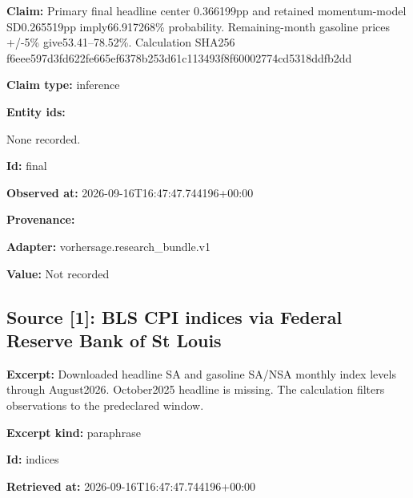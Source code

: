 \documentclass[11pt]{article}
\begin{document}
\par\noindent\textbf{Claim:} Primary final headline center 0.366199pp and retained momentum-model SD0.265519pp imply66.917268\% probability. Remaining-month gasoline prices +/-5\% give53.41–78.52\%. Calculation SHA256 f6eee597d3fd\hspace{0pt}622fe665ef63\hspace{0pt}78b253d61c11\hspace{0pt}3493f8f60002\hspace{0pt}774cd5318ddf\hspace{0pt}b2dd

\par\noindent\textbf{Claim type:} inference

\par\noindent\textbf{Entity ids:} \par None recorded.

\par\noindent\textbf{Id:} final

\par\noindent\textbf{Observed at:} 2026-09-16T1\hspace{0pt}6:47:47.7441\hspace{0pt}96+00:00

\par\noindent\textbf{Provenance:} \par \par\noindent\textbf{Adapter:} vorhersage.r\hspace{0pt}esearch\_bund\hspace{0pt}le.v1

\par\noindent\textbf{Value:} Not recorded

\subsection*{\textcolor{epdarkgreen}{Source [1]: BLS CPI indices via Federal Reserve Bank of St Louis}}
\par\noindent\textbf{Excerpt:} Downloaded headline SA and gasoline SA/NSA monthly index levels through August2026. October2025 headline is missing. The calculation filters observations to the predeclared window.

\par\noindent\textbf{Excerpt kind:} paraphrase

\par\noindent\textbf{Id:} indices

\par\noindent\textbf{Retrieved at:} 2026-09-16T1\hspace{0pt}6:47:47.7441\hspace{0pt}96+00:00
\end{document}
